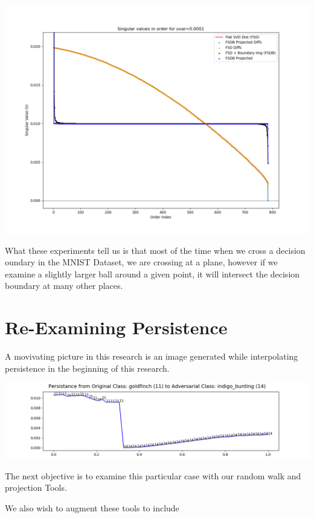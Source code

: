 \includegraphics[width=14cm]{c4_figures/e06-SVD-uniform-rand_diff-decision_boundary_uvar-0.0001-index-0-image-999.png}

What these experiments tell us is that most of the time when we cross a decision oundary in the MNIST Dataset, we are crossing at a plane, however if we examine a slightly larger ball around a given point, it will intersect the decision boundary at many other places. 

\section{Re-Examining Persistence}

A movivating picture in this research is an image generated while interpolating persistence in the beginning of this research. 

\includegraphics[width=15cm]{c4_figures/persistence_interpolation-IMNET-class-11-vgg16-BIM-48-attack_data-001 (2).png}

The next objective is to examine this particular case with our random walk and projection Tools. 

We also wish to augment these tools to include 


